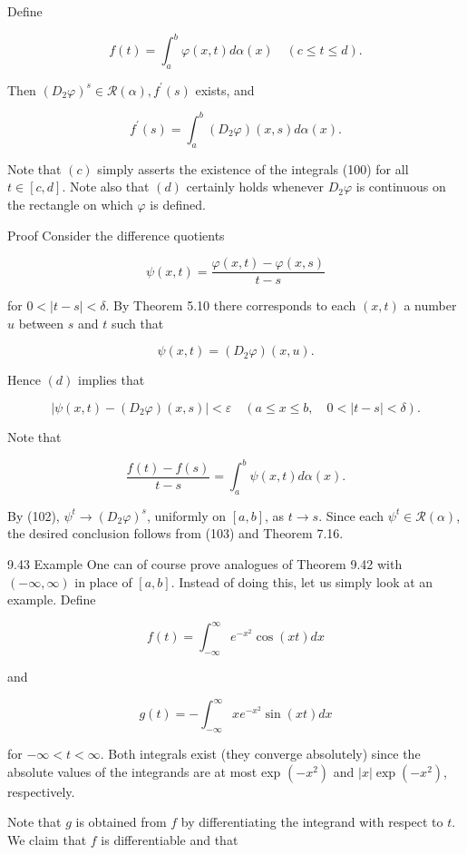 \documentclass[10pt]{article}
\begin{document}
Define

$$
f(t)=\int_{a}^{b} \varphi(x, t) d \alpha(x) \quad(c \leq t \leq d) .
$$

Then $\left(D_{2} \varphi\right)^{s} \in \mathscr{R}(\alpha), f^{\prime}(s)$ exists, and

$$
f^{\prime}(s)=\int_{a}^{b}\left(D_{2} \varphi\right)(x, s) d \alpha(x) .
$$

Note that $(c)$ simply asserts the existence of the integrals (100) for all $t \in[c, d]$. Note also that $(d)$ certainly holds whenever $D_{2} \varphi$ is continuous on the rectangle on which $\varphi$ is defined.

Proof Consider the difference quotients

$$
\psi(x, t)=\frac{\varphi(x, t)-\varphi(x, s)}{t-s}
$$

for $0<|t-s|<\delta$. By Theorem 5.10 there corresponds to each $(x, t)$ a number $u$ between $s$ and $t$ such that

$$
\psi(x, t)=\left(D_{2} \varphi\right)(x, u) .
$$

Hence $(d)$ implies that

$$
\left|\psi(x, t)-\left(D_{2} \varphi\right)(x, s)\right|<\varepsilon \quad(a \leq x \leq b, \quad 0<|t-s|<\delta) .
$$

Note that

$$
\frac{f(t)-f(s)}{t-s}=\int_{a}^{b} \psi(x, t) d \alpha(x) .
$$

By (102), $\psi^{t} \rightarrow\left(D_{2} \varphi\right)^{s}$, uniformly on $[a, b]$, as $t \rightarrow s$. Since each $\psi^{t} \in \mathscr{R}(\alpha)$, the desired conclusion follows from (103) and Theorem 7.16.

9.43 Example One can of course prove analogues of Theorem 9.42 with $(-\infty, \infty)$ in place of $[a, b]$. Instead of doing this, let us simply look at an example. Define

$$
f(t)=\int_{-\infty}^{\infty} e^{-x^{2}} \cos (x t) d x
$$

and

$$
g(t)=-\int_{-\infty}^{\infty} x e^{-x^{2}} \sin (x t) d x
$$

for $-\infty<t<\infty$. Both integrals exist (they converge absolutely) since the absolute values of the integrands are at most exp $\left(-x^{2}\right)$ and $|x| \exp \left(-x^{2}\right)$, respectively.

Note that $g$ is obtained from $f$ by differentiating the integrand with respect to $t$. We claim that $f$ is differentiable and that
\end{document}
